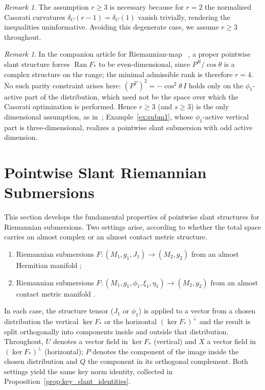 \documentclass[11pt]{amsart}
\theoremstyle{plain}
\theoremstyle{definition}
\theoremstyle{remark}
\newtheorem{remark}[proposition]{Remark}
\newcommand{\calV}{\mathcal{V}}
\begin{document}
\begin{remark}\label{rem:rank_two}
The assumption $r \geq 3$ is necessary because for $r = 2$ 
the normalized Casorati curvatures $\delta_C(r-1) 
= \delta_C(1)$ vanish trivially, rendering the 
inequalities uninformative. Avoiding this degenerate 
case, we assume $r \geq 3$ throughout.
\end{remark}
\begin{remark}
In the companion article for Riemannian-map ~\cite{FatimaMaps}, a proper pointwise
slant structure forces $\operatorname{Ran}F_*$ to be even-dimensional, since
$P^{R}/\cos\theta$ is a complex structure on the range; the minimal admissible
rank is therefore $r=4$. No such parity constraint arises here:
$(P^{\calV})^2=-\cos^2\theta\,I$ holds only on the $\phi_1$-active part of the
distribution, which need not be the space over which the Casorati optimization
is performed. Hence $r\ge 3$ (and $s\ge 3$) is the only dimensional assumption,
as in~\cite{LeeSahin2014,Kumar2020}; Example~\ref{ex:subm1}, whose
$\phi_1$-active vertical part is three-dimensional, realizes a pointwise slant
submersion with odd active dimension.
\end{remark}


\section{Pointwise Slant Riemannian Submersions}\label{sec:pointwise_slant}

This section develops the fundamental properties of pointwise slant structures
for Riemannian submersions. Two settings arise, according to whether the total
space carries an almost complex or an almost contact metric structure.
\begin{enumerate}[label=(\roman*),start=1]
  \item Riemannian submersions $F:(M_1,g_1,J_1)\to(M_2,g_2)$ from an almost
        Hermitian manifold \cite{LeeSahin2014,Sahin2013};
  \item Riemannian submersions
        $F:(M_1,g_1,\phi_1,\xi_1,\eta_1)\to(M_2,g_2)$ from an almost contact
        metric manifold \cite{LeeSahin2014,Kumar2020,Prasad2021}.
\end{enumerate}
In each case, the structure tensor ($J_1$ or $\phi_1$) is applied to a vector
from a chosen distribution the vertical $\ker F_*$ or the horizontal
$(\ker F_*)^{\perp}$ and the result is split orthogonally into components
inside and outside that distribution. Throughout, $U$ denotes a vector field in
$\ker F_*$ (vertical) and $X$ a vector field in $(\ker F_*)^{\perp}$
(horizontal); $P$ denotes the component of the image {inside} the chosen
distribution and $Q$ the component in its orthogonal complement. Both settings
yield the same key norm identity, collected in
Proposition~\ref{prop:key_slant_identities}.
\end{document}
